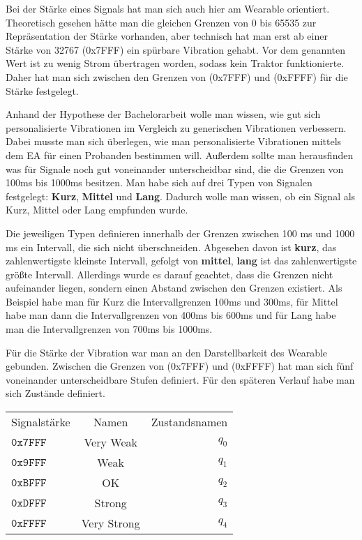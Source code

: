 Bei der St{\"a}rke eines Signals hat man sich auch hier am Wearable orientiert. 
Theoretisch gesehen h{\"a}tte man die gleichen Grenzen von 0 bis 65535 zur Repr{\"a}sentation der St{\"a}rke vorhanden, aber technisch hat man erst ab einer St{\"a}rke von 32767 (0x7FFF) ein sp{\"u}rbare Vibration gehabt. Vor dem genannten Wert ist zu wenig Strom {\"u}bertragen worden, sodass kein Traktor funktionierte.
Daher hat man sich zwischen den Grenzen von (0x7FFF) und (0xFFFF) f{\"u}r die St{\"a}rke festgelegt. 

Anhand der Hypothese der Bachelorarbeit wolle man wissen, wie gut sich personalisierte Vibrationen im Vergleich zu generischen Vibrationen verbessern. Dabei musste man sich {\"u}berlegen, wie man personalisierte Vibrationen mittels dem EA f{\"u}r einen Probanden bestimmen will.
Au{\ss}erdem sollte man herausfinden was f{\"u}r Signale noch gut voneinander unterscheidbar sind, die die Grenzen von 100ms bis 1000ms besitzen.
Man habe sich auf drei Typen von Signalen festgelegt: \textbf{Kurz}, \textbf{Mittel} und \textbf{Lang}. Dadurch wolle man wissen, ob ein Signal als Kurz, Mittel oder Lang empfunden wurde.

Die jeweiligen Typen definieren innerhalb der Grenzen zwischen 100 ms und 1000 ms ein Intervall, die sich nicht {\"u}berschneiden. Abgesehen davon ist \textbf{kurz}, das zahlenwertigste kleinste Intervall, gefolgt von \textbf{mittel}, \textbf{lang} ist das zahlenwertigste gr{\"o}{\ss}te Intervall.
Allerdings wurde es darauf geachtet, dass die Grenzen nicht aufeinander liegen, sondern einen Abstand zwischen den Grenzen existiert.
Als Beispiel habe man f{\"u}r Kurz die Intervallgrenzen 100ms und 300ms, f{\"u}r Mittel habe man dann die Intervallgrenzen von 400ms bis 600ms und f{\"u}r Lang habe man die Intervallgrenzen von 700ms bis 1000ms. 

F{\"u}r die St{\"a}rke der Vibration war man an den Darstellbarkeit des Wearable gebunden. Zwischen die Grenzen von (0x7FFF) und (0xFFFF) hat man sich f{\"u}nf voneinander unterscheidbare Stufen definiert. F{\"u}r den sp{\"a}teren Verlauf habe man sich Zust{\"a}nde definiert.

\begin{tabular}{lcr}
  Signalst{\"a}rke & Namen & Zustandsnamen \\
  $\mathtt{0x7FFF}$ & Very Weak & $q_{0}$ \\
  $\mathtt{0x9FFF}$ & Weak & $q_{1}$ \\
  $\mathtt{0xBFFF}$ & OK & $q_{2}$ \\
  $\mathtt{0xDFFF}$ & Strong & $q_{3}$ \\
  $\mathtt{0xFFFF}$ & Very Strong & $q_{4}$ \\
\end{tabular}

